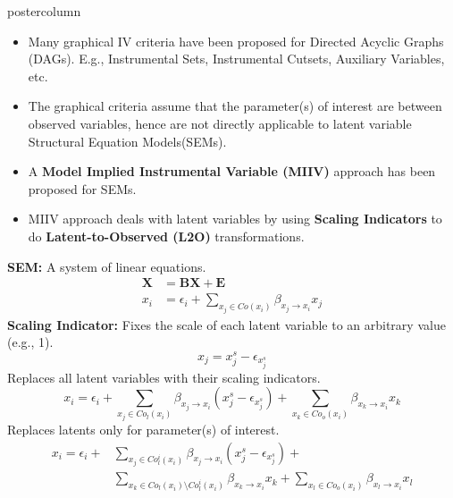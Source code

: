 \documentclass{beamer}
\begin{document}
\begin{frame}
\begin{columns}
\begin{column}{.33\textwidth}
\begin{beamercolorbox}[center]{postercolumn}
\begin{minipage}{.98\textwidth}
{\begin{myblock}{}
		\begin{itemize}
			\item \justifying Many graphical IV criteria have been
				proposed for Directed Acyclic Graphs (DAGs).
				E.g., Instrumental Sets, Instrumental Cutsets,
				Auxiliary Variables, etc.
			\item \justifying The graphical criteria assume that
				the parameter(s) of interest are between
				observed variables, hence are not directly
				applicable to latent variable Structural Equation Models(SEMs).
			\item \justifying A \textbf{Model Implied Instrumental
				Variable (MIIV)} approach has been proposed for
				SEMs.
			\item \justifying MIIV approach deals with latent
				variables by using \textbf{Scaling
				Indicators} to do \textbf{Latent-to-Observed (L2O)}
				transformations.
		\end{itemize}
	\end{myblock}\vfill
	\begin{myblock}{}
		\textbf{SEM:} A system of linear equations.
			\begin{equation*}
				\begin{split}
					\bm{X} &= \bm{BX} + \bm{E} \\
					x_i &= \epsilon_i + \sum_{x_j \in Co(x_i)} \beta_{x_j \to x_i} x_j 
				\end{split}
			\end{equation*}
		\textbf{Scaling Indicator:} Fixes the scale of each latent variable to an arbitrary value (e.g., 1).
			$$ x_j = x_j^s - \epsilon_{x_j^s} $$
		\textbf{} Replaces all latent variables with their scaling indicators.
 			$$ x_i = \epsilon_i + \sum_{x_j \in Co_l(x_i)} \beta_{x_j \rightarrow x_i} (x_j^s - \epsilon_{x_j^s}) + \sum_{x_k \in Co_o(x_i)} \beta_{x_k \rightarrow x_i} x_k $$
		\textbf{} Replaces latents only for parameter(s) of interest.
			\begin{equation*}
			\begin{split}
				x_i = \epsilon_i + & \sum_{x_j \in Co_l^i(x_i)} \beta_{x_j \rightarrow x_i} (x_j^s - \epsilon_{x_j^s}) +  \\
						   & \sum_{x_k \in Co_l(x_i) \setminus Co_l^i(x_i)} \beta_{x_k \rightarrow x_i} x_k + \sum_{x_l \in Co_o(x_i)} \beta_{x_l \rightarrow x_i} x_l
			\end{split}
			\end{equation*}

\end{myblock}}
\end{minipage}
\end{beamercolorbox}
\end{column}
\end{columns}
\end{frame}
\end{document}
